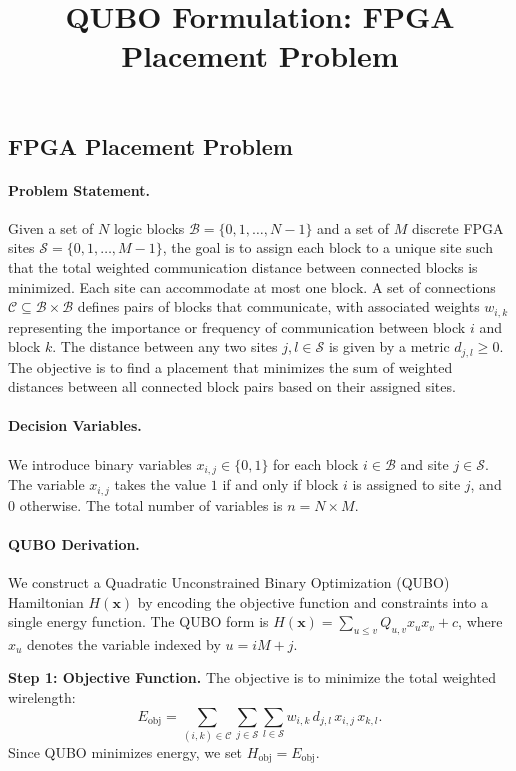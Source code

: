 \documentclass[12pt]{article}
\title{QUBO Formulation: FPGA Placement Problem}
\date{}
\begin{document}
\maketitle

\subsection*{FPGA Placement Problem}

\paragraph{Problem Statement.}
Given a set of $N$ logic blocks $\mathcal{B} = \{0, 1, \dots, N-1\}$ and a set of $M$ discrete FPGA sites $\mathcal{S} = \{0, 1, \dots, M-1\}$, the goal is to assign each block to a unique site such that the total weighted communication distance between connected blocks is minimized. Each site can accommodate at most one block. A set of connections $\mathcal{C} \subseteq \mathcal{B} \times \mathcal{B}$ defines pairs of blocks that communicate, with associated weights $w_{i,k}$ representing the importance or frequency of communication between block $i$ and block $k$. The distance between any two sites $j, l \in \mathcal{S}$ is given by a metric $d_{j,l} \ge 0$. The objective is to find a placement that minimizes the sum of weighted distances between all connected block pairs based on their assigned sites.

\paragraph{Decision Variables.}
We introduce binary variables $x_{i,j} \in \{0, 1\}$ for each block $i \in \mathcal{B}$ and site $j \in \mathcal{S}$. The variable $x_{i,j}$ takes the value $1$ if and only if block $i$ is assigned to site $j$, and $0$ otherwise. The total number of variables is $n = N \times M$.

\paragraph{QUBO Derivation.}
We construct a Quadratic Unconstrained Binary Optimization (QUBO) Hamiltonian $H(\mathbf{x})$ by encoding the objective function and constraints into a single energy function. The QUBO form is $H(\mathbf{x}) = \sum_{u \le v} Q_{u,v} x_u x_v + c$, where $x_u$ denotes the variable indexed by $u = i M + j$.

\textbf{Step 1: Objective Function.}
The objective is to minimize the total weighted wirelength:
\begin{equation}
    E_{\text{obj}} = \sum_{(i,k) \in \mathcal{C}} \sum_{j \in \mathcal{S}} \sum_{l \in \mathcal{S}} w_{i,k} \, d_{j,l} \, x_{i,j} \, x_{k,l}.
\end{equation}
Since QUBO minimizes energy, we set $H_{\text{obj}} = E_{\text{obj}}$.
\end{document}
